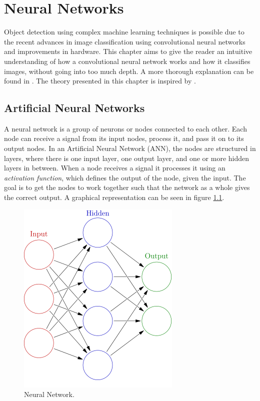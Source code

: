 
\chapter{Neural Networks}
Object detection using complex machine learning techniques is possible due to the recent advances in image classification using convolutional neural networks and improvements in hardware. This chapter aims to give the reader an intuitive understanding of how a convolutional neural network works and how it classifies images, without going into too much depth. A more thorough explanation can be found in \citep{Krizhevsky2012}. The theory presented in this chapter is inspired by \citep{cnn_stanford}.

\section{Artificial Neural Networks}
A neural network is a group of neurons or nodes connected to each other. Each node can receive a signal from its input nodes, process it, and pass it on to its output nodes. In an Artificial Neural Network (ANN), the nodes are structured in layers, where there is one input layer, one output layer, and one or more hidden layers in between. When a node receives a signal it processes it using an \textit{activation function}, which defines the output of the node, given the input. The goal is to get the nodes to work together such that the network as a whole gives the correct output. A graphical representation can be seen in figure \ref{fig:NN}.

\begin{figure}
    \centering
    \includegraphics[scale=0.4]{fig/neural_network.png}
    \caption{Neural Network.}
    \label{fig:NN}
\end{figure}

